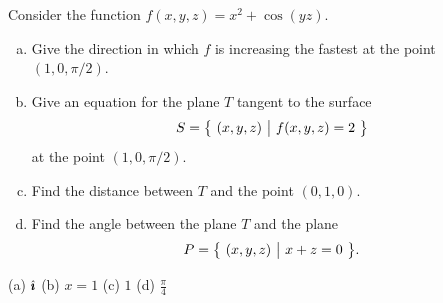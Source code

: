 \begin{solution}


\end{solution}



\begin{question}[M200 2008A] %
Consider the function $f(x,y,z) = x^2 + \cos(yz)$.

\begin{enumerate}[(a)]
\item
Give the direction in which $f$ is increasing the fastest at the point 
$(1, 0, \pi/2)$.

\item
Give an equation for the plane $T$ tangent to the surface 
\begin{equation*}
S = \big\{ \ (x,y,z)\ \big|\ f(x,y,z) = 2\ \big\}
\end{equation*}
at the point $(1, 0, \pi/2)$.

\item
Find the distance between $T$ and the point $(0, 1, 0)$.

\item
Find the angle between the plane $T$ and the plane
\begin{equation*}
P = \big\{ \ (x,y,z)\ \big|\ x + z = 0\ \big\}.
\end{equation*}

\end{enumerate}
\end{question}

%

\begin{answer}
(a) $\hat{\pmb{\imath}}$\qquad
(b) $x=1$\qquad
(c) $1$\qquad
(d) $\frac{\pi}{4}$
\end{answer}

